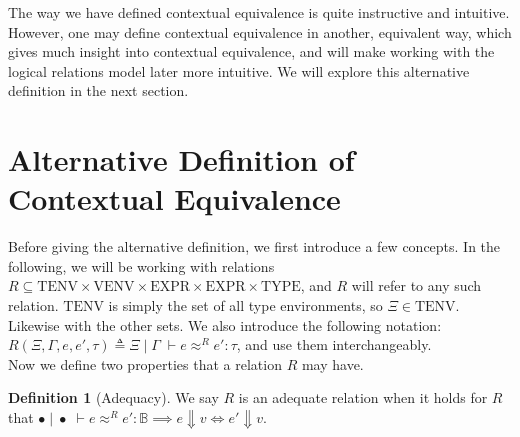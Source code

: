 \documentclass[a4paper, 11pt]{report}
\theoremstyle{definition}
\newtheorem{definition}{Definition}[section]
\newcommand{\expr}{e}
\newcommand{\val}{v}
\newcommand{\Tbool}{\mathbb{B}}
\newcommand{\typ}{\tau}
\newcommand{\venv}{\Gamma}
\newcommand{\tenv}{\Xi}
\newcommand{\emptenv}{\bullet}
\newcommand{\empvenv}{\bullet}
\newcommand{\VENV}{\mathrm{VENV}}
\newcommand{\TENV}{\mathrm{TENV}}
\newcommand{\EXPR}{\mathrm{EXPR}}
\newcommand{\TYPE}{\mathrm{TYPE}}
\newcommand{\jdgRel}[6]{#1 \; | \; #2 \; \vdash #3 \approx^{#4} #5 : #6}
\begin{document}
The way we have defined contextual equivalence is quite instructive and intuitive. However, one may define contextual equivalence in another, equivalent way, which gives much insight into contextual equivalence, and will make working with the logical relations model later more intuitive. We will explore this alternative definition in the next section.


\section{Alternative Definition of Contextual Equivalence}
Before giving the alternative definition, we first introduce a few concepts. In the following, we will be working with relations $R \subseteq \TENV \times \VENV \times \EXPR \times \EXPR \times \TYPE$, and $R$ will refer to any such relation. $\TENV$ is simply the set of all type environments, so $\tenv \in \TENV$. Likewise with the other sets. We also introduce the following notation: $R(\tenv, \venv, \expr, \expr', \typ) \triangleq \jdgRel{\tenv}{\venv}{\expr}{R}{\expr'}{\typ}$, and use them interchangeably.\\
Now we define two properties that a relation $R$ may have.
\begin{definition}[Adequacy]
  We say $R$ is an adequate relation when it holds for $R$ that $\jdgRel{\emptenv}{\empvenv}{\expr}{R}{\expr'}{\Tbool} \implies \expr \Downarrow \val \iff \expr' \Downarrow \val$.
\end{definition}
\end{document}
